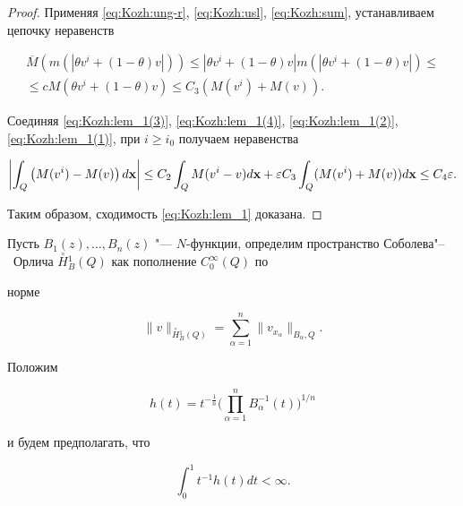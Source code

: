 \begin{proof}
Применяя \eqref{eq:Kozh:ung-r}, \eqref{eq:Kozh:usl}, \eqref{eq:Kozh:sum}, устанавливаем цепочку неравенств

\begin{multline}\label{eq:Kozh:lem_1(4)}

\overline{M}\left(

m(|\theta v^i+(1-\theta)v|)\right)\leq

|\theta v^i+(1-\theta)v|m(|\theta v^i+(1-\theta)v|)\le

\\

\leq c M(\theta v^i+(1-\theta)v)\leq C_3(M(v^i)+M(v)).

\end{multline}



Соединяя \eqref{eq:Kozh:lem_1(3)}, \eqref{eq:Kozh:lem_1(4)}, \eqref{eq:Kozh:lem_1(2)}, \eqref{eq:Kozh:lem_1(1)}, при $i\geq i_0$ получаем неравенства

$$\left|\int_Q

\left(M(v^i)-M(v)\right) d{\bf x}\right|\leq C_2 \int_Q

M(v^i-v)d{\bf x}+\varepsilon C_3\int_Q(M(v^i)+M(v))d{\bf x}\leq C_4 \varepsilon.

$$

Таким образом, сходимость \eqref{eq:Kozh:lem_1} доказана.

\end{proof}



\smallskip





Пусть $B_1(z),\dots,B_n(z)$ "--- $N$-функции, определим пространство Соболева"--~Орлича $\stackrel

{\circ}

{H}\!_{B}^1(Q)$ как пополнение $C_0^{\infty}(Q)$ по

норме

$$

\|v\|_{\stackrel {\circ}

{H}{}_{B}^1(Q)}=\sum_{\alpha=1}^n\|v_{x_\alpha}\|_{B_\alpha,Q}.$$

Положим

$$

h(t)=t^{-\frac{1}{n}}\biggl(\prod_{\alpha=1}^n B_{\alpha}^{-1}(t)\biggr)^{{1}/{n}}

$$

и будем предполагать, что

$$\int_0^1{t}^{-1}{h(t)}dt<\infty.$$

